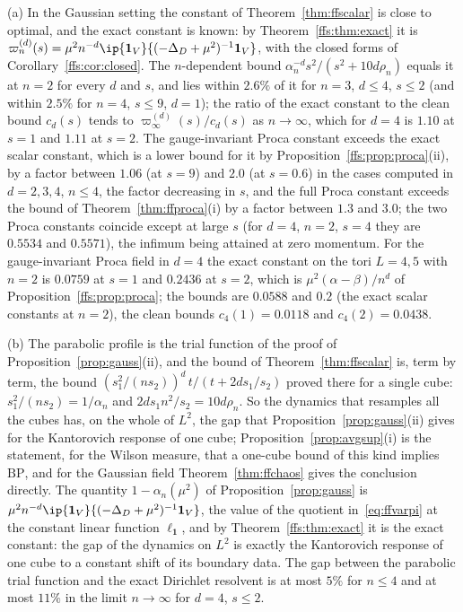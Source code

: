 \begin{remark}\label{rem:ffnumbers}
(a) In the Gaussian setting the constant of Theorem~\ref{thm:ffscalar} is
close to optimal, and the exact constant is known: by Theorem~\ref{ffs:thm:exact}
it is $\varpi_n^{(d)}(s)=\mu^2n^{-d}\ip{\mathbf 1_V}{(-\Delta_D+\mu^2)^{-1}
\mathbf 1_V}$, with the closed forms of Corollary~\ref{ffs:cor:closed}. The
$n$-dependent bound $\alpha_n^{-d}s^2/(s^2+10d\rho_n)$ equals it at $n=2$ for
every $d$ and $s$, and lies within $2.6\%$ of it for $n=3$, $d\le4$, $s\le2$ (and within $2.5\%$ for $n=4$, $s\le9$,
$d=1$); the ratio of the exact constant to the clean bound $c_d(s)$ tends to
$\varpi_\infty^{(d)}(s)/c_d(s)$ as $n\to\infty$, which for $d=4$ is $1.10$ at
$s=1$ and $1.11$ at $s=2$. The gauge-invariant Proca constant exceeds the exact
scalar constant, which is a lower bound for it by Proposition~\ref{ffs:prop:proca}(ii),
by a factor between $1.06$ (at $s=9$) and $2.0$ (at $s=0.6$) in the cases
computed in $d=2,3,4$, $n\le4$, the factor decreasing in $s$, and the full
Proca constant exceeds the bound of Theorem~\ref{thm:ffproca}(i) by a factor
between $1.3$ and $3.0$; the two Proca constants coincide except at large $s$
(for $d=4$, $n=2$, $s=4$ they are $0.5534$ and $0.5571$), the infimum being
attained at zero momentum. For the gauge-invariant Proca field in $d=4$ the
exact constant on the tori $L=4,5$ with $n=2$ is $0.0759$ at $s=1$ and
$0.2436$ at $s=2$, which is $\mu^2(\alpha-\beta)/n^d$ of
Proposition~\ref{ffs:prop:proca}; the bounds are $0.0588$ and $0.2$ (the exact
scalar constants at $n=2$), the clean bounds $c_4(1)=0.0118$ and $c_4(2)=
0.0438$.

(b) The parabolic profile is the trial function of the proof of
Proposition~\ref{prop:gauss}(ii), and the bound of Theorem~\ref{thm:ffscalar}
is, term by term, the bound $(s_1^2/(ns_2))^d\,t/(t+2ds_1/s_2)$ proved there
for a single cube: $s_1^2/(ns_2)=1/\alpha_n$ and $2ds_1n^2/s_2=10d\rho_n$. So
the dynamics that resamples all the cubes has, on the whole of $L^2$, the
gap that Proposition~\ref{prop:gauss}(ii) gives for the Kantorovich response
of one cube; Proposition~\ref{prop:avgsup}(i) is the statement, for the
Wilson measure, that a one-cube bound of this kind implies $\mathrm{BP}$, and
for the Gaussian field Theorem~\ref{thm:ffchaos} gives the conclusion
directly. The quantity $1-\alpha_n(\mu^2)$ of Proposition~\ref{prop:gauss} is
$\mu^2n^{-d}\ip{\mathbf 1_V}{(-\Delta_D+\mu^2)^{-1}\mathbf 1_V}$, the value of
the quotient in~\eqref{eq:ffvarpi} at the constant linear function $\ell_{
\mathbf 1}$, and by Theorem~\ref{ffs:thm:exact} it is the exact constant: the
gap of the dynamics on $L^2$ is exactly the Kantorovich response of one cube to
a constant shift of its boundary data. The gap between the parabolic trial
function and the exact Dirichlet resolvent is at most $5\%$ for $n\le4$ and at
most $11\%$ in the limit $n\to\infty$ for $d=4$, $s\le2$.


\end{remark}
